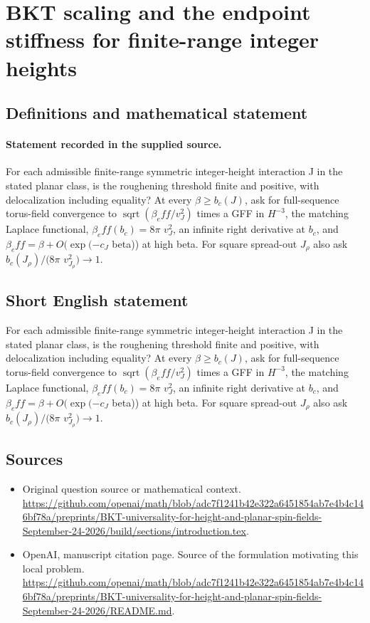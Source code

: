 \documentclass[11pt]{article}
\begin{document}
\section*{BKT scaling and the endpoint stiffness for finite-range integer heights}\label{statement}
\subsection{Definitions and mathematical statement}
\paragraph{Statement recorded in the supplied source.}
For each admissible finite-range symmetric integer-height interaction J in the stated planar class, is the roughening threshold finite and positive, with delocalization including equality? At every $\beta \geq b_c(J)$, ask for full-sequence torus-field convergence to $\operatorname{sqrt}(\beta _eff/v_J^2)$ times a GFF in $H^{-3}$, the matching Laplace functional, $\beta _eff(b_c)=8\pi $ $v_J^2$, an infinite right derivative at $b_c$, and $\beta _eff=\beta +O(\exp (-c_J$ beta)) at high beta. For square spread-out $J_\rho $ also ask $b_c(J_\rho )/(8\pi $ $v_{J_\rho }^2)\to 1$.
\subsection{Short English statement}
For each admissible finite-range symmetric integer-height interaction J in the stated planar class, is the roughening threshold finite and positive, with delocalization including equality? At every $\beta \geq b_c(J)$, ask for full-sequence torus-field convergence to $\operatorname{sqrt}(\beta _eff/v_J^2)$ times a GFF in $H^{-3}$, the matching Laplace functional, $\beta _eff(b_c)=8\pi $ $v_J^2$, an infinite right derivative at $b_c$, and $\beta _eff=\beta +O(\exp (-c_J$ beta)) at high beta. For square spread-out $J_\rho $ also ask $b_c(J_\rho )/(8\pi $ $v_{J_\rho }^2)\to 1$.
\subsection{Sources}
\begin{itemize}
\item[S1] Original question source or mathematical context.
\url{https://github.com/openai/math/blob/adc7f1241b42e322a6451854ab7e4b4c146bf78a/preprints/BKT-universality-for-height-and-planar-spin-fields-September-24-2026/build/sections/introduction.tex}.
\item[S2] OpenAI, manuscript citation page. Source of the formulation motivating this local problem.
\url{https://github.com/openai/math/blob/adc7f1241b42e322a6451854ab7e4b4c146bf78a/preprints/BKT-universality-for-height-and-planar-spin-fields-September-24-2026/README.md}.
\end{itemize}
\end{document}
